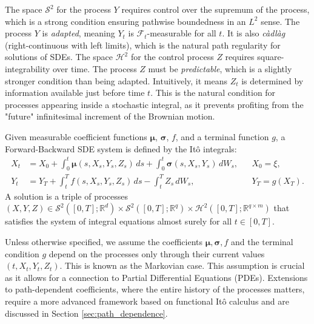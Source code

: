 \begin{remark}
The space \(\mathcal{S}^2\) for the process \(Y\) requires control over the supremum of the process, which is a strong condition ensuring pathwise boundedness in an \(L^2\) sense. The process \(Y\) is \emph{adapted}, meaning \(Y_t\) is \(\mathcal{F}_t\)-measurable for all \(t\). It is also \emph{c\`adl\`ag} (right-continuous with left limits), which is the natural path regularity for solutions of SDEs. The space \(\mathcal{H}^2\) for the control process \(Z\) requires square-integrability over time. The process \(Z\) must be \emph{predictable}, which is a slightly stronger condition than being adapted. Intuitively, it means \(Z_t\) is determined by information available just before time \(t\). This is the natural condition for processes appearing inside a stochastic integral, as it prevents profiting from the "future" infinitesimal increment of the Brownian motion.
\end{remark}

\begin{definition}
\label{def:FBSDE}
Given measurable coefficient functions \(\bm\mu\), \(\bm\sigma\), \(f\), and a terminal function \(g\), a Forward-Backward SDE system is defined by the Itô integrals:
\begin{align}\label{eq:FBSDE_canonical}
  X_t &= X_0 + \int_0^t \bm\mu(s,X_s,Y_s,Z_s)\,ds
        + \int_0^t \bm\sigma(s,X_s,Y_s)\,dW_s, && X_0=\xi, \\
  Y_t &= Y_T + \int_t^T f(s,X_s,Y_s,Z_s)\,ds - \int_t^T Z_s\,dW_s, && Y_T=g(X_T).
\end{align}
A solution is a triple of processes \((X,Y,Z)\in \mathcal S^2([0,T];\mathbb{R}^d) \times \mathcal S^2([0,T];\mathbb{R}^q) \times \mathcal H^2([0,T];\mathbb{R}^{q \times m})\) that satisfies the system of integral equations almost surely for all $t \in [0,T]$.
\end{definition}

\begin{remark}
Unless otherwise specified, we assume the coefficients \(\bm\mu, \bm\sigma, f\) and the terminal condition \(g\) depend on the processes only through their current values \((t, X_t, Y_t, Z_t)\). This is known as the Markovian case. This assumption is crucial as it allows for a connection to Partial Differential Equations (PDEs). Extensions to path-dependent coefficients, where the entire history of the processes matters, require a more advanced framework based on functional Itô calculus and are discussed in Section \ref{sec:path_dependence}.
\end{remark}

